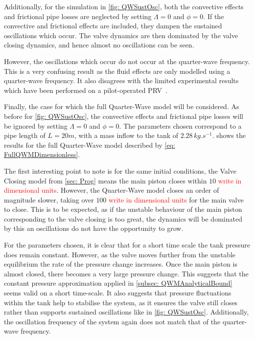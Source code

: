 Additionally, for the simulation in \cref{fig: QWSustOsc}, both the convective effects and frictional pipe losses are neglected by setting $\Lambda = 0$ and $\phi = 0$. If the convective and frictional effects are included, they dampen the sustained oscillations which occur. The valve dynamics are then dominated by the valve closing dynamics, and hence almost no oscillations can be seen.

However, the oscillations which occur do not occur at the quarter-wave frequency. This is a very confusing result as the fluid effects are only modelled using a quarter-wave frequency. It also disagrees with the limited experimental results which have been performed on a pilot-operated PRV~\cite{Allison2015TestingValves}.


Finally, the case for which the full Quarter-Wave model will be considered. As before for \cref{fig: QWSustOsc}, the convective effects and frictional pipe losses will be ignored by setting $\Lambda = 0$ and $\phi = 0$. The parameters chosen correspond to a pipe length of $L = 20 \si{m}$, with a mass inflow to the tank of $2.28 \, \si{kg.s^{-1}}$.  shows the results for the full Quarter-Wave model described by \cref{eq: FullQWMDimensionless}.
~


The first interesting point to note is for the same initial conditions, the Valve Closing model from \cref{sec: Prog} means the main piston closes within $10$ \textcolor{Red}{write in dimensional units}. However, the Quarter-Wave model closes an order of magnitude slower, taking over $100$ \textcolor{Red}{write in dimensional units} for the main valve to close. This is to be expected, as if the unstable behaviour of the main piston corresponding to the valve closing is too great, the dynamics will be dominated by this an oscillations do not have the opportunity to grow.

For the parameters chosen, it is clear that for a short time scale the tank pressure does remain constant. However, as the valve moves further from the unstable equilibrium the rate of the pressure change increases. Once the main piston is almost closed, there becomes a very large pressure change. This suggests that the constant pressure approximation applied in \cref{subsec: QWMAnalyticalBound} seems valid on a short time-scale. It also suggests that pressure fluctuations within the tank help to stabilise the system, as it ensures the valve still closes rather than supports sustained oscillations like in \cref{fig: QWSustOsc}. Additionally, the oscillation frequency of the system again does not match that of the quarter-wave frequency.


